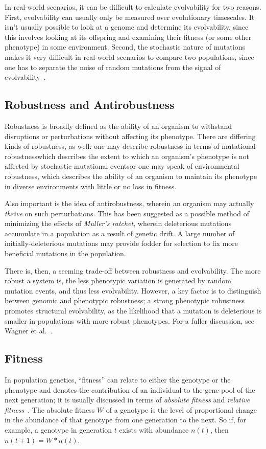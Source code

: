 In real-world scenarios, it can be difficult to calculate evolvability for two reasons. First, evolvability can usually only be measured over evolutionary timescales. It isn't usually possible to look at a genome and determine its evolvability, since this involves looking at its offspring and examining their fitness (or some other phenotype) in some environment. Second, the stochastic nature of mutations makes it very difficult in real-world scenarios to compare two populations, since one has to separate the noise of random mutations from the signal of evolvability~\cite{selectionEvolvability}. 

\subsection{Robustness and Antirobustness}\label{subsec:robustness_antirobustness}
Robustness is broadly defined as the ability of an organism to withstand disruptions or perturbations without affecting its phenotype. There are differing kinds of robustness, as well: one may describe robustness in terms of mutational robustness\textendash which describes the extent to which an organism's phenotype is not affected by stochastic mutational events\textendash or one may speak of environmental robustness, which describes the ability of an organism to maintain its phenotype in diverse environments with little or no loss in fitness. 

Also important is the idea of antirobustness, wherein an organism may actually \textit{thrive} on such perturbations. This has been suggested as a possible method of minimizing the effects of \textit{Muller's ratchet}, wherein deleterious mutations accumulate in a population as a result of genetic drift\cite{Gordo2137}. A large number of initially-deleterious mutations may provide fodder for selection to fix more beneficial mutations in the population\cite{doi:10.1186/s12862-019-1507-z}.

There is, then, a seeming trade-off between robustness and evolvability. The more robust a system is, the less phenotypic variation is generated by random mutation events, and thus less evolvability. However, a key factor is to distinguish between genomic and phenotypic robustness; a strong phenotypic robustness promotes structural evolvability, as the likelihood that a mutation is deleterious is smaller in populations with more robust phenotypes. For a fuller discussion, see Wagner et al.~\cite{doi:10.1098/rspb.2007.1137}.

\subsection{Fitness}\label{background:fitness}
In population genetics, ``fitness'' can relate to either the genotype or the phenotype and denotes the contribution of an individual to the gene pool of the next generation; it is usually discussed in terms of \textit{absolute fitness} and \textit{relative fitness}~\cite{cutter2019primer}. The absolute fitness $W$ of a genotype is the level of proportional change in the abundance of that genotype from one generation to the next. So if, for example, a genotype in generation $t$ exists with abundance $n(t)$, then $n(t+1) = W*n(t)$. 

